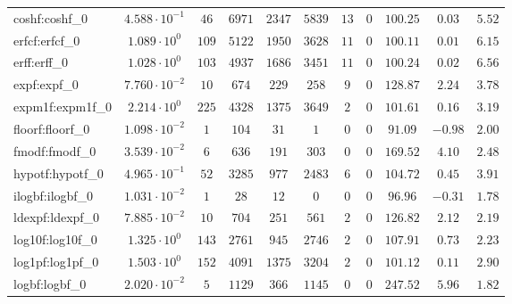 \begin{tabular}{|l|c|c|c|c|c|c|c|c|c|c|}
coshf:coshf\_0               & $ 4.588 \cdot 10^{-1} $ & $ 46     $ & $ 6971   $ & $ 2347  $ & $ 5839  $ & $ 13  $ & $ 0 $ & $ 100.25      $ & $ 0.03    $ & $ 5.52    $ \\
erfcf:erfcf\_0               & $ 1.089 \cdot 10^{0}  $ & $ 109    $ & $ 5122   $ & $ 1950  $ & $ 3628  $ & $ 11  $ & $ 0 $ & $ 100.11      $ & $ 0.01    $ & $ 6.15    $ \\
erff:erff\_0                 & $ 1.028 \cdot 10^{0}  $ & $ 103    $ & $ 4937   $ & $ 1686  $ & $ 3451  $ & $ 11  $ & $ 0 $ & $ 100.24      $ & $ 0.02    $ & $ 6.56    $ \\
expf:expf\_0                 & $ 7.760 \cdot 10^{-2} $ & $ 10     $ & $ 674    $ & $ 229   $ & $ 258   $ & $ 9   $ & $ 0 $ & $ 128.87      $ & $ 2.24    $ & $ 3.78    $ \\
expm1f:expm1f\_0             & $ 2.214 \cdot 10^{0}  $ & $ 225    $ & $ 4328   $ & $ 1375  $ & $ 3649  $ & $ 2   $ & $ 0 $ & $ 101.61      $ & $ 0.16    $ & $ 3.19    $ \\
floorf:floorf\_0             & $ 1.098 \cdot 10^{-2} $ & $ 1      $ & $ 104    $ & $ 31    $ & $ 1     $ & $ 0   $ & $ 0 $ & $ 91.09       $ & $ -0.98   $ & $ 2.00    $ \\
fmodf:fmodf\_0               & $ 3.539 \cdot 10^{-2} $ & $ 6      $ & $ 636    $ & $ 191   $ & $ 303   $ & $ 0   $ & $ 0 $ & $ 169.52      $ & $ 4.10    $ & $ 2.48    $ \\
hypotf:hypotf\_0             & $ 4.965 \cdot 10^{-1} $ & $ 52     $ & $ 3285   $ & $ 977   $ & $ 2483  $ & $ 6   $ & $ 0 $ & $ 104.72      $ & $ 0.45    $ & $ 3.91    $ \\
ilogbf:ilogbf\_0             & $ 1.031 \cdot 10^{-2} $ & $ 1      $ & $ 28     $ & $ 12    $ & $ 0     $ & $ 0   $ & $ 0 $ & $ 96.96       $ & $ -0.31   $ & $ 1.78    $ \\
ldexpf:ldexpf\_0             & $ 7.885 \cdot 10^{-2} $ & $ 10     $ & $ 704    $ & $ 251   $ & $ 561   $ & $ 2   $ & $ 0 $ & $ 126.82      $ & $ 2.12    $ & $ 2.19    $ \\
log10f:log10f\_0             & $ 1.325 \cdot 10^{0}  $ & $ 143    $ & $ 2761   $ & $ 945   $ & $ 2746  $ & $ 2   $ & $ 0 $ & $ 107.91      $ & $ 0.73    $ & $ 2.23    $ \\
log1pf:log1pf\_0             & $ 1.503 \cdot 10^{0}  $ & $ 152    $ & $ 4091   $ & $ 1375  $ & $ 3204  $ & $ 2   $ & $ 0 $ & $ 101.12      $ & $ 0.11    $ & $ 2.90    $ \\
logbf:logbf\_0               & $ 2.020 \cdot 10^{-2} $ & $ 5      $ & $ 1129   $ & $ 366   $ & $ 1145  $ & $ 0   $ & $ 0 $ & $ 247.52      $ & $ 5.96    $ & $ 1.82    $ \\

\end{tabular}

